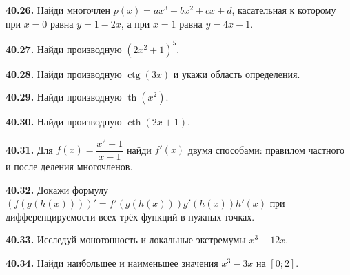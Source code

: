 \noindent\begin{minipage}[t]{\linewidth}\textbf{40.26.}\starmark{} Найди многочлен \(p(x)=ax^3+bx^2+cx+d\), касательная к которому при \(x=0\) равна \(y=1-2x\), а при \(x=1\) равна \(y=4x-1\).\par\end{minipage}\par
\noindent\begin{minipage}[t]{\linewidth}\textbf{40.27.} Найди производную \((2x^2+1)^5\).\par\end{minipage}\par
\noindent\begin{minipage}[t]{\linewidth}\textbf{40.28.} Найди производную \(\operatorname{ctg}(3x)\) и укажи область определения.\par\end{minipage}\par
\noindent\begin{minipage}[t]{\linewidth}\textbf{40.29.} Найди производную \(\operatorname{th}(x^2)\).\par\end{minipage}\par
\noindent\begin{minipage}[t]{\linewidth}\textbf{40.30.} Найди производную \(\operatorname{cth}(2x+1)\).\par\end{minipage}\par
\noindent\begin{minipage}[t]{\linewidth}\textbf{40.31.} Для \(f(x)=\dfrac{x^2+1}{x-1}\) найди \(f'(x)\) двумя способами: правилом частного и после деления многочленов.\par\end{minipage}\par
\noindent\begin{minipage}[t]{\linewidth}\textbf{40.32.}\starmark{} Докажи формулу \((f(g(h(x))))'=f'(g(h(x)))g'(h(x))h'(x)\) при дифференцируемости всех трёх функций в нужных точках.\par\end{minipage}\par
\noindent\begin{minipage}[t]{\linewidth}\textbf{40.33.} Исследуй монотонность и локальные экстремумы \(x^3-12x\).\par\end{minipage}\par
\noindent\begin{minipage}[t]{\linewidth}\textbf{40.34.} Найди наибольшее и наименьшее значения \(x^3-3x\) на \([0;2]\).\par\end{minipage}\par
